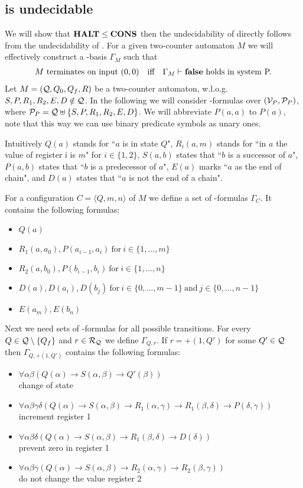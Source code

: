 \subsection{\PCons{} is undecidable}
We will show that $\textbf{HALT}\leq\textbf{CONS}$ then the undecidability of \PCons{} directly follows from the undecidability of \autHalt. For a given two-counter automaton $M$ we will effectively construct a \SysP-basis $\Gamma_M$ such that
\begin{align*}
 & \text{$M$ terminates on input $(0,0)$} &   & \text{iff} & \text{$\Gamma_M\vdash\textbf{false}$ holds in system P.} 
\end{align*}
Let $M=(\mathcal{Q},Q_0,Q_f,R)$ be a two-counter automaton, w.l.o.g. $S,P,R_1,R_2,E,D\notin\mathcal{Q}$. In the following we will consider \SysP-formulas over $(\mathcal{V}_P,\mathcal{P}_P)$, where $\mathcal{P}_P=\mathcal{Q}\uplus\{S,P,R_1,R_2,E,D\}$. We will abbreviate $P(a,a)$ to $P(a)$, note that this way we can use binary predicate symbols as unary ones.

Intuitively $Q(a)$ stands for ``$a$ is in state $Q$", $R_i(a,m)$ stands for ``in $a$ the value of register i is $m$" for $i\in\{1,2\}$, $S(a,b)$ states that ``$b$ is a successor of $a$", $P(a,b)$ states that ``$b$ is a predecessor of $a$", $E(a)$ marks ``$a$ as the end of chain", and $D(a)$ states that ``$a$ is not the end of a chain".

For a configuration $C=\langle Q,m,n\rangle$ of $M$ we define a set of \SysP-formulas $\Gamma_C$. It contains the following formulas:
\begin{itemize}
	\item $Q(a)$
	\item $R_1(a,a_0),P(a_{i-1},a_i)~\text{for}~i\in\{1,\dots,m\}$
	\item $R_2(a,b_0),P(b_{i-1},b_i)~\text{for}~i\in\{1,\dots,n\}$
	\item $D(a),D(a_i),D(b_j)~\text{for}~i\in\{0,\dots,m-1\}~\text{and}~j\in\{0,\dots,n-1\}$
	\item $E(a_m),E(b_n)$
\end{itemize}
Next we need sets of \SysP-formulas for all possible transitions.
For every $Q\in\mathcal{Q}\setminus\{Q_f\}$ and $r\in\mathcal{R}_{\mathcal{Q}}$ we define $\Gamma_{Q,r}$.
If $r=+(1,Q')$ for some $Q'\in\mathcal{Q}$ then $\Gamma_{Q,+(1,Q')}$ contains the following formulas:
\begin{itemize}
	\item $\forall\alpha\beta(Q(\alpha)\to S(\alpha,\beta)\to Q'(\beta))$ \\change of state
	\item $\forall\alpha\beta\gamma\delta(Q(\alpha)\to S(\alpha,\beta)\to R_1(\alpha,\gamma)\to R_1(\beta,\delta)\to P(\delta,\gamma))$\\increment register 1
	\item $\forall\alpha\beta\delta(Q(\alpha)\to S(\alpha,\beta)\to R_1(\beta,\delta)\to D(\delta))$ \\prevent zero in register 1
	\item $\forall\alpha\beta\gamma(Q(\alpha)\to S(\alpha,\beta)\to R_2(\alpha,\gamma)\to R_2(\beta,\gamma))$ \\do not change the value register 2
\end{itemize}

